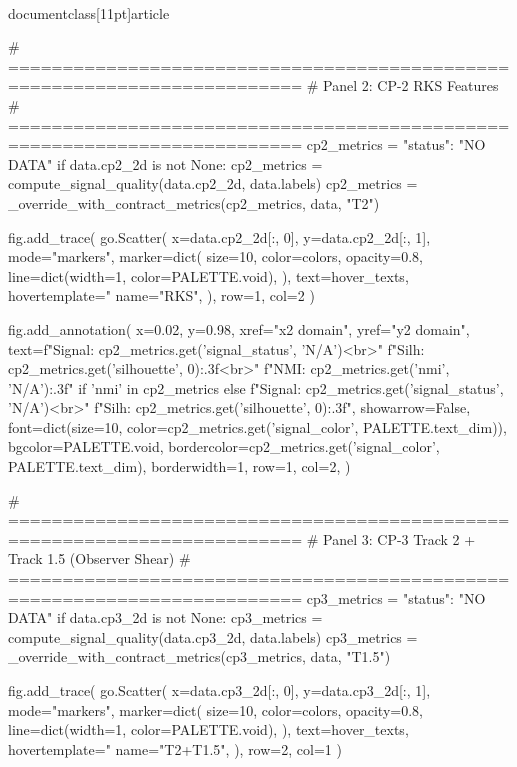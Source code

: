 \\documentclass[11pt]{article}
\begin{document}
\begin{CodeBlock}
    # =========================================================================
    # Panel 2: CP-2 RKS Features
    # =========================================================================
    cp2_metrics = {"status": "NO DATA"}
    if data.cp2_2d is not None:
        cp2_metrics = compute_signal_quality(data.cp2_2d, data.labels)
        cp2_metrics = _override_with_contract_metrics(cp2_metrics, data, "T2")

        fig.add_trace(
            go.Scatter(
                x=data.cp2_2d[:, 0],
                y=data.cp2_2d[:, 1],
                mode="markers",
                marker=dict(
                    size=10,
                    color=colors,
                    opacity=0.8,
                    line=dict(width=1, color=PALETTE.void),
                ),
                text=hover_texts,
                hovertemplate="%
                name="RKS",
            ),
            row=1, col=2
        )

        fig.add_annotation(
            x=0.02, y=0.98,
            xref="x2 domain", yref="y2 domain",
            text=f"Signal: {cp2_metrics.get('signal_status', 'N/A')}<br>"
                 f"Silh: {cp2_metrics.get('silhouette', 0):.3f}<br>"
                 f"NMI: {cp2_metrics.get('nmi', 'N/A'):.3f}" if 'nmi' in cp2_metrics else
                 f"Signal: {cp2_metrics.get('signal_status', 'N/A')}<br>"
                 f"Silh: {cp2_metrics.get('silhouette', 0):.3f}",
            showarrow=False,
            font=dict(size=10, color=cp2_metrics.get('signal_color', PALETTE.text_dim)),
            bgcolor=PALETTE.void,
            bordercolor=cp2_metrics.get('signal_color', PALETTE.text_dim),
            borderwidth=1,
            row=1, col=2,
        )

    # =========================================================================
    # Panel 3: CP-3 Track 2 + Track 1.5 (Observer Shear)
    # =========================================================================
    cp3_metrics = {"status": "NO DATA"}
    if data.cp3_2d is not None:
        cp3_metrics = compute_signal_quality(data.cp3_2d, data.labels)
        cp3_metrics = _override_with_contract_metrics(cp3_metrics, data, "T1.5")

        fig.add_trace(
            go.Scatter(
                x=data.cp3_2d[:, 0],
                y=data.cp3_2d[:, 1],
                mode="markers",
                marker=dict(
                    size=10,
                    color=colors,
                    opacity=0.8,
                    line=dict(width=1, color=PALETTE.void),
                ),
                text=hover_texts,
                hovertemplate="%
                name="T2+T1.5",
            ),
            row=2, col=1
        )


\end{CodeBlock}
\end{document}
